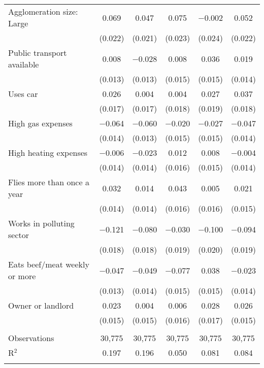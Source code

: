 \begin{tabular}{@{\extracolsep{5pt}}lccccc}
  Agglomeration size: Large & 0.069 & 0.047 & 0.075 & $-$0.002 & 0.052 \\ 
  & (0.022) & (0.021) & (0.023) & (0.024) & (0.022) \\ 
  Public transport available & 0.008 & $-$0.028 & 0.008 & 0.036 & 0.019 \\ 
  & (0.013) & (0.013) & (0.015) & (0.015) & (0.014) \\ 
  Uses car & 0.026 & 0.004 & 0.004 & 0.027 & 0.037 \\ 
  & (0.017) & (0.017) & (0.018) & (0.019) & (0.018) \\ 
  High gas expenses & $-$0.064 & $-$0.060 & $-$0.020 & $-$0.027 & $-$0.047 \\ 
  & (0.014) & (0.013) & (0.015) & (0.015) & (0.014) \\ 
  High heating expenses & $-$0.006 & $-$0.023 & 0.012 & 0.008 & $-$0.004 \\ 
  & (0.014) & (0.014) & (0.016) & (0.015) & (0.014) \\ 
  Flies more than once a year & 0.032 & 0.014 & 0.043 & 0.005 & 0.021 \\ 
  & (0.014) & (0.014) & (0.016) & (0.016) & (0.015) \\ 
  Works in polluting sector & $-$0.121 & $-$0.080 & $-$0.030 & $-$0.100 & $-$0.094 \\ 
  & (0.018) & (0.018) & (0.019) & (0.020) & (0.019) \\ 
  Eats beef/meat weekly or more & $-$0.047 & $-$0.049 & $-$0.077 & 0.038 & $-$0.023 \\ 
  & (0.013) & (0.014) & (0.015) & (0.015) & (0.014) \\ 
  Owner or landlord & 0.023 & 0.004 & 0.006 & 0.028 & 0.026 \\ 
  & (0.015) & (0.015) & (0.016) & (0.017) & (0.015) \\ 
 \hline \\[-1.8ex] 

Observations & 30,775 & 30,775 & 30,775 & 30,775 & 30,775 \\ 
R$^{2}$ & 0.197 & 0.196 & 0.050 & 0.081 & 0.084 \\ 
\hline 
\hline \\[-1.8ex] 
\end{tabular} 